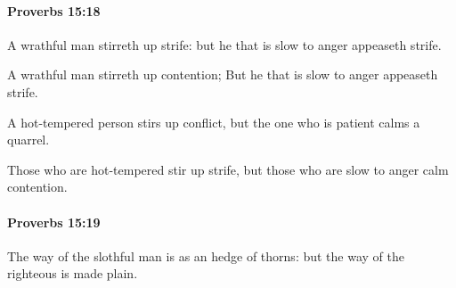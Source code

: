 		\paragraph{Proverbs 15:18} %
			\label{PROVERBS-15-18}

			A wrathful man stirreth up strife: but he that is slow to anger appeaseth strife.

			\begin{versebox}
					\item[BHS] 
					\item[ASV] A wrathful man stirreth up contention; But he that is slow to anger appeaseth strife.
					\item[NIV] A hot-tempered person stirs up conflict, but the one who is patient calms a quarrel.
					\item[NRSV] Those who are hot-tempered stir up strife, but those who are slow to anger calm contention.
			\end{versebox}

		\paragraph{Proverbs 15:19} %
			\label{PROVERBS-15-19}

			The way of the slothful man is as an hedge of thorns: but the way of the righteous is made plain.

